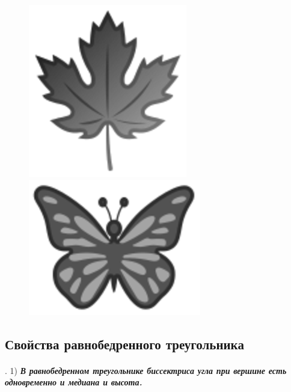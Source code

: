 \documentclass[twoside]{book}
\begin{document}
\begin{figure}[h!]
\begin{minipage}{.48\textwidth}
\centering
\includegraphics{eps/klenovyj-list}
\end{minipage}\hfill
\begin{minipage}{.48\textwidth}
\centering
\includegraphics{eps/babochka}
\end{minipage}

\medskip

\begin{minipage}{.48\textwidth}
\centering
\caption{}\label{1938/ris-42}
\end{minipage}\hfill
\begin{minipage}{.48\textwidth}
\centering
\caption{}\label{1938/ris-43}
\end{minipage}
\vskip-4mm
\end{figure}

\subsection*{Свойства равнобедренного треугольника}

\paragraph{}\label{1938/38}
.
1) \textbf{\emph{В равнобедренном треугольнике биссектриса угла при вершине есть одновременно и медиана и высота.}}
\end{document}
